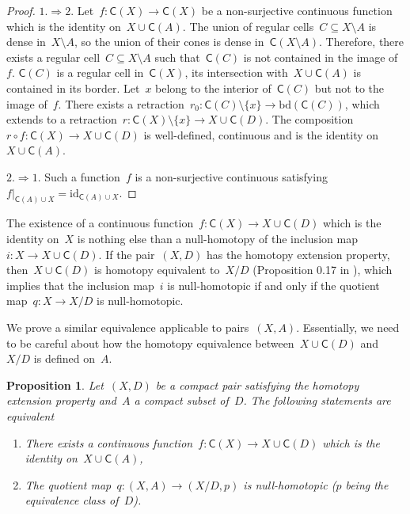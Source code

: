 \documentclass[english,11pt]{article}
\theoremstyle{plain}
\newtheorem{proposition}{Proposition}[section]
\theoremstyle{remark}
\theoremstyle{definition}
\newcommand{\id}{\mathrm{id}}
\newcommand{\bd}[1]{\mathrm{bd}(#1)}
\newcommand{\C}[1]{\mathsf{C}(#1)}%
\begin{document}
\begin{proof}
$1.\Rightarrow 2.$ Let~$f:\C{X}\to\C{X}$ be a non-surjective continuous function which is the identity on~$X\cup\C{A}$. The union of regular cells~$C\subseteq X\setminus A$ is dense in~$X\setminus A$, so the union of their cones is dense in~$\C{X\setminus A}$. Therefore, there exists a regular cell~$C\subseteq X\setminus A$ such that~$\C{C}$ is not contained in the image of~$f$. $\C{C}$ is a regular cell in~$\C{X}$, its intersection with~$X\cup \C{A}$ is contained in its border. Let~$x$ belong to the interior of~$\C{C}$ but not to the image of~$f$. There exists a retraction~$r_0:\C{C}\setminus \{x\}\to\bd{\C{C}}$, which extends to a retraction~$r:\C{X}\setminus \{x\}\to X\cup\C{D}$. The composition~$r\circ f:\C{X}\to X\cup \C{D}$ is well-defined, continuous and is the identity on~$X\cup \C{A}$.

$2.\Rightarrow 1.$ Such a function~$f$ is a non-surjective continuous satisfying~$f|_{\C A\cup X}=\id{}_{\C A\cup X}$.
\end{proof}

The existence of a continuous function~$f:\C{X}\to X\cup\C{D}$ which is the identity on~$X$ is nothing else than a null-homotopy of the inclusion map~$i:X\to X\cup\C{D}$. If the pair~$(X,D)$ has the homotopy extension property, then~$X\cup\C{D}$ is homotopy equivalent to~$X/D$ (Proposition 0.17 in \cite{Hatcher02}), which implies that the inclusion map~$i$ is null-homotopic if and only if the quotient map~$q:X\to X/D$ is null-homotopic.

We prove a similar equivalence applicable to pairs~$(X,A)$. Essentially, we need to be careful about how the homotopy equivalence between~$X\cup\C{D}$ and~$X/D$ is defined on~$A$.

\begin{proposition}\label{prop_quotient_map}
Let~$(X,D)$ be a compact pair satisfying the homotopy extension property and~$A$ a compact subset of~$D$. The following statements are equivalent
\begin{enumerate}
\item There exists a continuous function~$f:\C X\to X\cup\C D$ which is
the identity on~$X\cup\C A$,
\item The quotient map~$q:(X,A)\to(X/D,p)$ is null-homotopic ($p$ being the equivalence class of~$D$).
\end{enumerate}
\end{proposition}
\end{document}
